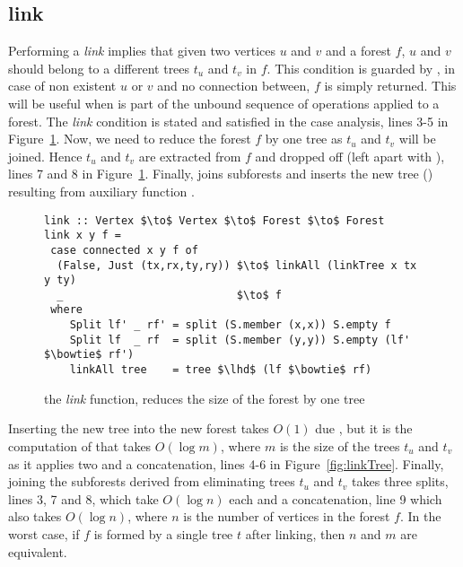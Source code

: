 \subsection{link}
Performing a \textit{link} implies that given two vertices $u$ and $v$ and a forest $f$, $u$ and $v$ should belong to a different trees $t_u$ and $t_v$ in $f$. This condition is guarded by , in case of non existent $u$ or $v$ and no connection between, $f$ is simply returned. This will be useful when  is part of the unbound sequence of operations applied to a forest. The \textit{link} condition is stated and satisfied in the case analysis, lines 3-5 in Figure~\ref{fig:link}. 
Now, we need to reduce the forest $f$ by one tree as $t_u$ and $t_v$ will be joined. Hence $t_u$ and $t_v$ are extracted from $f$ and dropped off (left apart with \code{_}), lines 7 and 8 in Figure~\ref{fig:link}. Finally,  joins subforests  and inserts the new tree () resulting from auxiliary function .  

\begin{figure}
\begin{lstlisting}[mathescape] 
link :: Vertex $\to$ Vertex $\to$ Forest $\to$ Forest 
link x y f = 
 case connected x y f of 
  (False, Just (tx,rx,ty,ry)) $\to$ linkAll (linkTree x tx y ty) 
  _                           $\to$ f 
 where 
    Split lf' _ rf' = split (S.member (x,x)) S.empty f 
    Split lf  _ rf  = split (S.member (y,y)) S.empty (lf' $\bowtie$ rf') 
    linkAll tree    = tree $\lhd$ (lf $\bowtie$ rf) 
\end{lstlisting} 
\caption{the \textit{link} function, reduces the size of the forest by one tree}
\label{fig:link}
\end{figure}

Inserting the new tree into the new forest takes $O(1)$ due , but it is the computation of  that takes $O(\log m)$, where $m$ is the size of the trees $t_u$ and $t_v$ as it applies two  and a concatenation, lines 4-6 in Figure~\ref{fig:linkTree}. Finally, joining the subforests derived from eliminating trees $t_u$ and $t_v$ takes three splits, lines 3, 7 and 8, which take $O(\log n)$ each and a concatenation, line 9 which also takes $O(\log n)$, where $n$ is the number of vertices in the forest $f$. In the worst case, if $f$ is formed by a single tree $t$ after linking, then $n$ and $m$ are equivalent.

